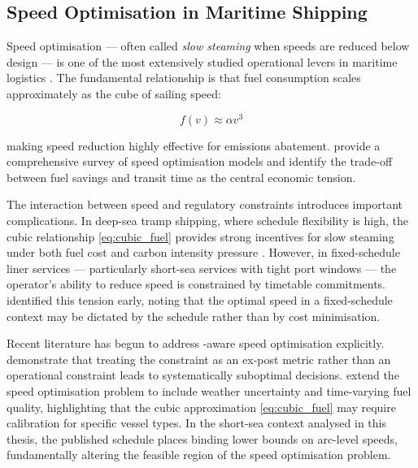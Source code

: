 \subsection{Speed Optimisation in Maritime Shipping}
\label{sec:lit:speed}

Speed optimisation --- often called \textit{slow steaming} when speeds
are reduced below design --- is one of the most extensively studied
operational levers in maritime logistics
\parencite{psaraftis2013speed, ronen1982ship}.
The fundamental relationship is that fuel consumption scales
approximately as the cube of sailing speed:

\begin{equation}
  f(v) \approx \alpha v^3
  \label{eq:cubic_fuel}
\end{equation}

\noindent making speed reduction highly effective for emissions abatement.
\textcite{psaraftis2013speed} provide a comprehensive survey of speed
optimisation models and identify the trade-off between fuel savings and
transit time as the central economic tension.

The interaction between speed and regulatory constraints introduces important
complications.  In deep-sea tramp shipping, where schedule flexibility is
high, the cubic relationship \cref{eq:cubic_fuel} provides strong incentives
for slow steaming under both fuel cost and carbon intensity pressure
\parencite{PsaraftisKontovas2013SpeedModels}.  However, in fixed-schedule
liner services --- particularly short-sea services with tight port windows ---
the operator's ability to reduce speed is constrained by timetable commitments.
\textcite{ronen1982ship} identified this tension early, noting that the
optimal speed in a fixed-schedule context may be dictated by the schedule
rather than by cost minimisation.

Recent literature has begun to address \CII{}-aware speed optimisation
explicitly.  \textcite{cheng2025cii} demonstrate that treating the \CII{}
constraint as an ex-post metric rather than an operational constraint leads
to systematically suboptimal decisions.  \textcite{GolsefidiSharifiGhader2025WeatherSpeedFuel}
extend the speed optimisation problem to include weather uncertainty and
time-varying fuel quality, highlighting that the cubic approximation
\cref{eq:cubic_fuel} may require calibration for specific vessel types.
In the short-sea \RoRo{} context analysed in this thesis, the published
schedule places binding lower bounds on arc-level speeds, fundamentally
altering the feasible region of the speed optimisation problem.

